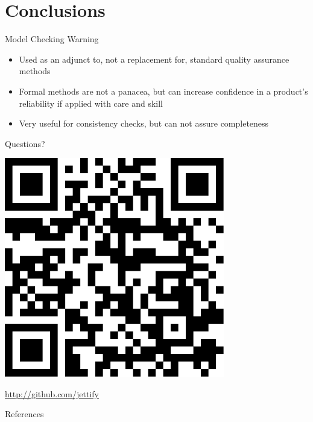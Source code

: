 \documentclass[12pt]{beamer}
\begin{document}
  \section{Conclusions}
  \begin{frame}{Model Checking Warning}
    \begin{itemize}
      \item Used as an adjunct to, not a replacement for, standard quality
          assurance methods
      \item Formal methods are not a panacea, but can increase confidence in
          a product’s reliability if applied with care and skill
      \item Very useful for consistency checks, but can not assure
          completeness
    \end{itemize}
  \end{frame}
\begin{frame}
    \vspace{1cm}
    \begin{center}{\Huge Questions?} \end{center}
    \begin{center} \includegraphics[scale=0.7]{figures/qrcode}\end{center}
    \begin{center}
        \href{http://github.com/jettify}{http://github.com/jettify}
    \end{center}
\end{frame}
\appendix
\begin{frame}[allowframebreaks]{References}
    
    
\end{frame}
\end{document}
